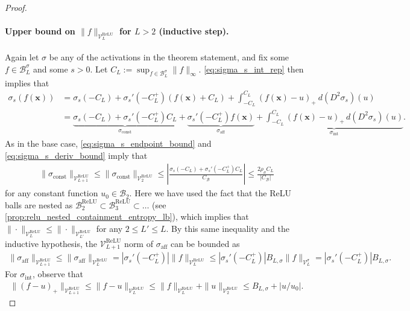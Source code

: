 \documentclass{article}
\DeclareMathOperator{\ReLU}{\mathrm{ReLU}}
\def\vx{{\bm{x}}}
\def\cB{{\mathcal{B}}}
\def\cV{{\mathcal{V}}}
\begin{document}
\begin{appendices}
\begin{proof}
    \paragraph{Upper bound on $\| f \|_{\cV_L^{\ReLU}}$ for $L > 2$ (inductive step).} Again let $\sigma$ be any of the activations in the theorem statement, and fix some $f \in \cB_L^\sigma$ and some $s > 0$. Let $C_L := \sup_{f \in \cB_L^\sigma} \| f \|_\infty$. \eqref{eq:sigma_s_int_rep} then implies that
    \begin{align} \label{eq:sigma_s_int_rep_f}
        \sigma_s(f(\vx)) &= \sigma_s(-C_L) + \sigma_s'(-C_L^+)(f(\vx) + C_L) + \int_{-C_L}^{C_L} (f(\vx) - u)_+ \ d(D^2 \sigma_s)(u) \\
        &= \underbrace{\sigma_s(-C_L) + \sigma_s'(-C_L^+) C_L}_{\sigma_\mathrm{const}} + \underbrace{\sigma_s'(-C_L^+) f(\vx)}_{\sigma_\mathrm{aff}} + \underbrace{\int_{-C_L}^{C_L} (f(\vx) - u)_+ \, d(D^2 \sigma_s)(u)}_{\sigma_\mathrm{int}}.
    \end{align} 
    As in the base case, \eqref{eq:sigma_s_endpoint_bound} and \eqref{eq:sigma_s_deriv_bound} imply that
    \begin{align} \label{eq:sigma_const_upper_bound_inductive}
        \| \sigma_\mathrm{const} \|_{\cV_{L+1}^{\ReLU} } \leq \| \sigma_\mathrm{const} \|_{\cV_2^{\ReLU}} \leq \left| \frac{\sigma_s(-C_L) + \sigma_s'(-C_L^+) C_L}{C_{\cB}} \right| \leq  \frac{2 \rho_\sigma C_L }{|C_{\cB}|} 
    \end{align}
    for any constant function $u_0 \in \cB_2$. Here we have used the fact that the ReLU balls are nested as $\cB_2^{\ReLU} \subset \cB_3^{\ReLU} \subset \dots$ (see \cref{prop:relu_nested_containment_entropy_lb}), which implies that $\| \cdot \|_{\cV_L^{\ReLU}} \leq \| \cdot \|_{\cV_{L'}^{\ReLU}}$ for any $2 \leq L' \leq L$. By this same inequality and the inductive hypothesis, the $\cV_{L+1}^{\ReLU}$ norm of $\sigma_{\mathrm{aff}}$ can be bounded as
    \begin{align} \label{eq:sigma_aff_upper_bound_inductive}
        \| \sigma_{\mathrm{aff}} \|_{\cV_{L+1}^{\ReLU}} \leq \| \sigma_{\mathrm{aff}} \|_{\cV_L^{\ReLU}} = |\sigma_s'(-C_L^+)| \| f \|_{\cV_L^{\ReLU}} \leq |\sigma_s'(-C_L^+)| B_{L,\sigma} \| f \|_{\cV_L^\sigma} = |\sigma_s'(-C_L^+)|  B_{L,\sigma}.
    \end{align}
    For $\sigma_{\mathrm{int}}$, observe that 
    \begin{align} 
        \| ( f - u )_+ \|_{\cV_{L+1}^{\ReLU}} \leq \| f - u \|_{\cV_L^{\ReLU}} \leq \| f \|_{\cV_L^{\ReLU}} + \| u \|_{\cV_2^{\ReLU}} \leq  B_{L,\sigma} + |u/u_0|.

\end{align}
\end{proof}
\end{appendices}
\end{document}
